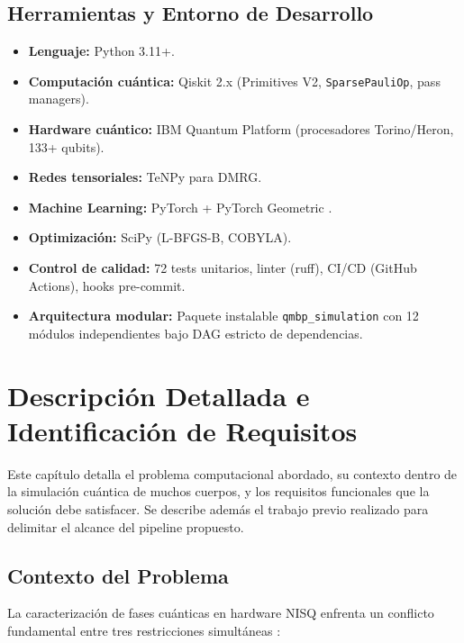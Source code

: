 \documentclass[11pt,a4paper,spanish]{book}
\begin{document}
\section{Herramientas y Entorno de Desarrollo}

\begin{itemize}
    \item \textbf{Lenguaje:} Python 3.11+.
    \item \textbf{Computación cuántica:} Qiskit 2.x (Primitives V2, \texttt{SparsePauliOp}, pass managers).
    \item \textbf{Hardware cuántico:} IBM Quantum Platform (procesadores Torino/Heron, 133+ qubits).
    \item \textbf{Redes tensoriales:} TeNPy \citep{hauschild2018} para DMRG.
    \item \textbf{Machine Learning:} PyTorch + PyTorch Geometric \citep{fey2019}.
    \item \textbf{Optimización:} SciPy (L-BFGS-B, COBYLA).
    \item \textbf{Control de calidad:} 72 tests unitarios, linter (ruff), CI/CD (GitHub Actions), hooks pre-commit.
    \item \textbf{Arquitectura modular:} Paquete instalable \texttt{qmbp\_simulation} con 12 módulos independientes bajo DAG estricto de dependencias.
\end{itemize}



\chapter{Descripción Detallada e Identificación de Requisitos}

Este capítulo detalla el problema computacional abordado, su contexto dentro de la simulación cuántica de muchos cuerpos, y los requisitos funcionales que la solución debe satisfacer. Se describe además el trabajo previo realizado para delimitar el alcance del pipeline propuesto.

\section{Contexto del Problema}

La caracterización de fases cuánticas en hardware NISQ enfrenta un conflicto fundamental entre tres restricciones simultáneas \citep{tilly2022, mele2026}:
\end{document}
